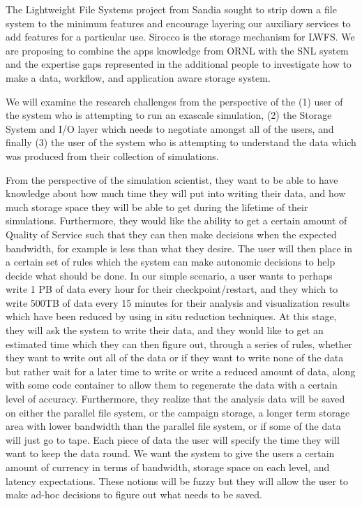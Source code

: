 The Lightweight File Systems project from Sandia sought to strip down a file
system to the minimum features and encourage layering our auxiliary services to
add features for a particular use. Sirocco is the storage mechanism for LWFS.
We are proposing to combine the apps knowledge from ORNL with the SNL system
and the expertise gaps represented in the additional people to investigate how
to make a data, workflow, and application aware storage system.

We will examine the research challenges from the perspective of the
%
(1) user of the system who is attempting to run an exascale simulation,
%
(2) the Storage System and I/O layer which needs to negotiate amongst all of
the users, and finally
%
(3) the user of the system who is attempting to understand the data which
was produced from their collection of simulations.

From the perspective of the simulation scientist, they want to be able to
have knowledge about how much time they will put into writing their data,
and how much storage space they will be able to get during the lifetime of
their simulations. Furthermore, they would like the ability to get a certain
amount of Quality of Service such that they can then make decisions when the
expected bandwidth, for example is less than what they desire. The user will
then place in a certain set of rules which the system can make autonomic
decisions to help decide what should be done. In our simple scenario, a user
wants to perhaps write 1 PB of data every hour for their checkpoint/restart,
and they which to write 500TB of data every 15 minutes for their analysis
and visualization results which have been reduced by using in situ reduction
techniques. At this stage, they will ask the system to write their data, and
they would like to get an estimated time which they can then figure out,
through a series of rules, whether they want to write out all of the data or
if they want to write none of the data but rather wait for a later time to
write or write a reduced amount of data, along with some code container to
allow them to regenerate the data with a certain level of accuracy.
Furthermore, they realize that the analysis data will be saved on either the
parallel file system, or the campaign storage, a longer term storage area
with lower bandwidth than the parallel file system, or if some of the data
will just go to tape. Each piece of data the user will specify the time they
will want to keep the data round. We want the system to give the users a
certain amount of currency in terms of bandwidth, storage space on each
level, and latency expectations. These notions will be fuzzy but they will
allow the user to make ad-hoc decisions to figure out what needs to be
saved.

